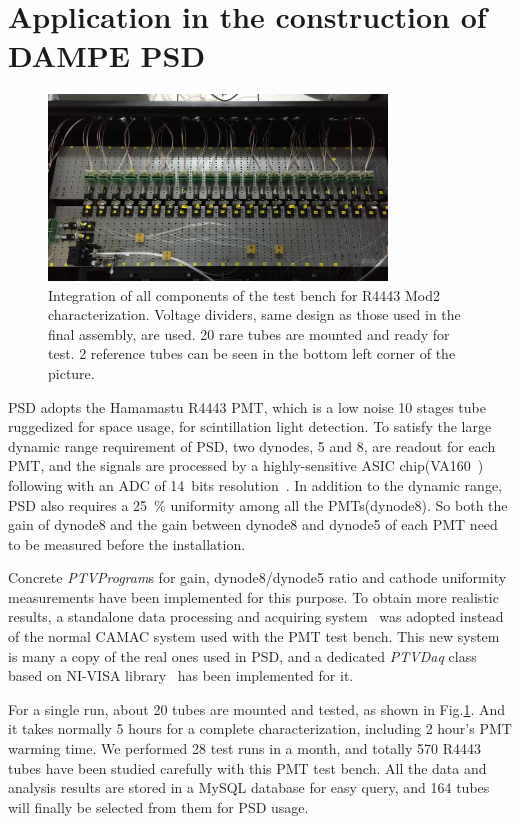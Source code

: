 \documentclass[5p, times]{elsarticle}
\begin{document}
\section{Application in the construction of DAMPE PSD}
\label{sec:application}

\begin{figure}
 \centering
 \includegraphics[width=90mm]{integration3}
\caption{Integration of all components of the test bench for R4443 Mod2 characterization.
Voltage dividers, same design as those used in the final assembly, are used. 
20 rare tubes are mounted and ready for test.
2 reference tubes can be seen in the bottom left corner of the picture. 
}
\label{fig:integrated_testbench}
\end{figure}

PSD adopts the Hamamastu R4443 PMT, which is a low noise 10 stages tube ruggedized for space usage, for scintillation light detection.
To satisfy the large dynamic range requirement of PSD, two dynodes, 5 and 8, are readout for each PMT, 
and the signals are processed by a highly-sensitive ASIC chip(VA160~\cite{va160}) following with an ADC of 14~bits resolution~\cite{fee}. 
In addition to the dynamic range, PSD also requires a \SI{25}{\percent} uniformity among all the PMTs(dynode8). 
So both the gain of dynode8 and the gain between dynode8 and dynode5 of each PMT need to be measured before the installation.

Concrete \textit{PTVProgram}s for gain, dynode8/dynode5 ratio and cathode uniformity measurements have been implemented for this purpose.
To obtain more realistic results, a standalone data processing and acquiring system~\cite{fee} was adopted instead of the normal CAMAC system used with the PMT test bench. 
This new system is many a copy of the real ones used in PSD, and a dedicated \textit{PTVDaq} class based on NI-VISA library~\cite{ni_visa} has been implemented for it.

For a single run, about 20 tubes are mounted and tested, as shown in Fig.\ref{fig:integrated_testbench}.
And it takes normally 5 hours for a complete characterization, including 2 hour's PMT warming time. 
We performed 28 test runs in a month, and totally 570 R4443 tubes have been studied carefully with this PMT test bench. 
All the data and analysis results are stored in a MySQL database for easy query, and 164 tubes will finally be selected from them for PSD usage.
\end{document}
